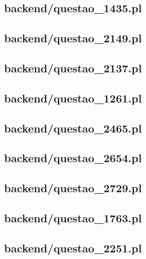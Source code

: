 \subsection*{backend/questao\_1435.pl}


\subsection*{backend/questao\_2149.pl}


\subsection*{backend/questao\_2137.pl}


\subsection*{backend/questao\_1261.pl}


\subsection*{backend/questao\_2465.pl}


\subsection*{backend/questao\_2654.pl}


\subsection*{backend/questao\_2729.pl}


\subsection*{backend/questao\_1763.pl}


\subsection*{backend/questao\_2251.pl}


